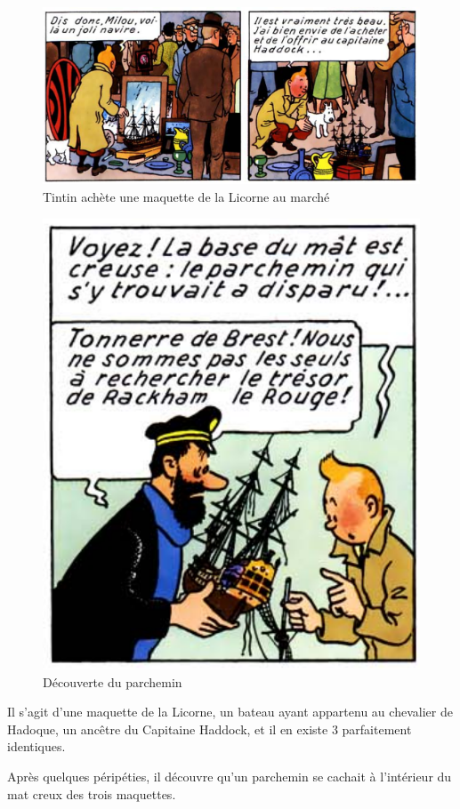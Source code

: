\begin{figure}[ht!]
\begin{center}
 \includegraphics[width=.7\textwidth]{img/marche}
\end{center}
\vspace{-0.8cm}
\caption{\label{fig01} Tintin achète une maquette de la Licorne au marché}
\end{figure}

\begin{figure}
\vspace{-\baselineskip}
    \centering\includegraphics[width=0.75\linewidth]{img/decouverte}
	\caption{\label{fig02} Découverte du parchemin}
\end{figure}

Il s'agit d'une maquette de la Licorne, un bateau ayant appartenu au chevalier de Hadoque, un ancêtre du Capitaine Haddock, et il en existe 3 parfaitement identiques.

Après quelques péripéties, il découvre qu'un parchemin se cachait à l'intérieur du mat creux des trois maquettes.

